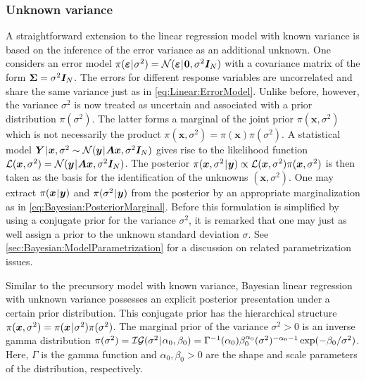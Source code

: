 \subsubsection{Unknown variance}
A straightforward extension to the linear regression model with known variance is based on the inference of the error variance as an additional unknown.
One considers an error model \(\pi(\bm{\varepsilon} {\:\!}|{\:\!} \sigma^2) = \mathcal{N}(\bm{\varepsilon} {\:\!}|{\:\!} \bm{0}, \sigma^2 \bm{I}_N)\)
with a covariance matrix of the form \(\bm{\Sigma} = \sigma^2 \bm{I}_N\).
The errors for different response variables are uncorrelated and share the same variance just as in \cref{eq:Linear:ErrorModel}.
Unlike before, however, the variance \(\sigma^2\) is now treated as uncertain and associated with a prior distribution \(\pi(\sigma^2)\).
The latter forms a marginal of the joint prior \(\pi(\bm{x},\sigma^2)\) which is not necessarily the product \(\pi(\bm{x},\sigma^2) = \pi(\bm{x}) \pi(\sigma^2)\).
A statistical model \(\bm{Y} {\:\!}|{\:\!} \bm{x},\sigma^2 \sim \mathcal{N}(\bm{y} {\:\!}|{\:\!} \bm{A} \bm{x}, \sigma^2 \bm{I}_N)\)
gives rise to the likelihood function \(\mathcal{L}(\bm{x},\sigma^2) = \mathcal{N}(\bm{y} {\:\!}|{\:\!} \bm{A} \bm{x}, \sigma^2 \bm{I}_N)\).
The posterior \(\pi(\bm{x},\sigma^2 {\:\!}|{\:\!} \bm{y}) \propto \mathcal{L}(\bm{x},\sigma^2) \pi(\bm{x},\sigma^2)\)
is then taken as the basis for the identification of the unknowns \((\bm{x},\sigma^2)\).
One may extract \(\pi(\bm{x} {\:\!}|{\:\!} \bm{y})\) and \(\pi(\sigma^2 {\:\!}|{\:\!} \bm{y})\) from the posterior by an appropriate marginalization as in \cref{eq:Bayesian:PosteriorMarginal}.
Before this formulation is simplified by using a conjugate prior for the variance \(\sigma^2\),
it is remarked that one may just as well assign a prior to the unknown standard deviation \(\sigma\).
See \cref{sec:Bayesian:ModelParametrization} for a discussion on related parametrization issues.
\par %
Similar to the precursory model with known variance, Bayesian linear regression with unknown variance possesses an explicit posterior presentation under a certain prior distribution.
This conjugate prior has the hierarchical structure \(\pi(\bm{x},\sigma^2) = \pi(\bm{x} {\:\!}|{\:\!} \sigma^2) \pi(\sigma^2)\).
The marginal prior of the variance \(\sigma^2 > 0\) is an inverse gamma distribution
\(\pi(\sigma^2) = \mathcal{IG}(\sigma^2 {\:\!}|{\:\!} \alpha_0,\beta_0) = \Gamma^{-1}(\alpha_0) \beta_0^{\alpha_0} (\sigma^2)^{-\alpha_0-1} \exp(-\beta_0/\sigma^2)\).
Here, \(\Gamma\) is the gamma function and \(\alpha_0,\beta_0 > 0\) are the shape and scale parameters of the distribution, respectively.
